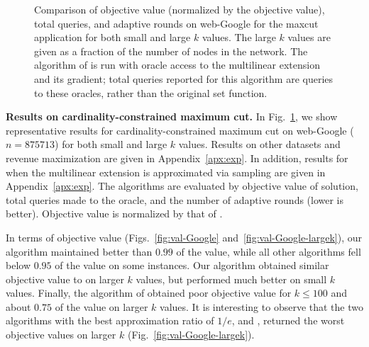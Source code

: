 \begin{figure}[t]
{  }
  \caption{Comparison of objective value (normalized by the \iter objective value), 
    total queries, and adaptive rounds on web-Google for the maxcut application for 
    both small and large $k$ values. The large $k$ values are given as a fraction of the number of nodes in the network. The algorithm of  is run with oracle access to the multilinear extension and its gradient; total queries reported for this algorithm are queries to these oracles, rather than the original set function.  } \label{fig:main}
\end{figure}

\textbf{Results on cardinality-constrained maximum cut.}
In Fig.~\ref{fig:main}, we show representative results for cardinality-constrained
maximum cut on web-Google ($n=875713$)
for both small and large $k$ values. Results on other datasets
and revenue maximization are given in Appendix~\ref{apx:exp}.
In addition, results for  when the multilinear
extension is approximated via sampling are given in Appendix~\ref{apx:exp}.
The algorithms are evaluated by objective value of
solution, total queries made to the oracle, and the number of adaptive rounds (lower is better).
Objective value is normalized by that of \iter. 

In terms of objective value (Figs.~\ref{fig:val-Google} and~\ref{fig:val-Google-largek}), 
our algorithm \latg maintained better than $0.99$ of the \iter value,
while all other algorithms fell below $0.95$ of the \iter value on some instances. 
Our algorithm \atg obtained similar objective value to \anm on larger $k$ values,
but performed much better on small $k$ values. Finally, the algorithm of 
obtained poor objective value for $k \le 100$ and about $0.75$ of the \iter value
on larger $k$ values. It is interesting to observe that the two algorithms with
the best approximation ratio of $1/e$,  and \frg, returned 
the worst objective values on larger $k$ (Fig.~\ref{fig:val-Google-largek}).

